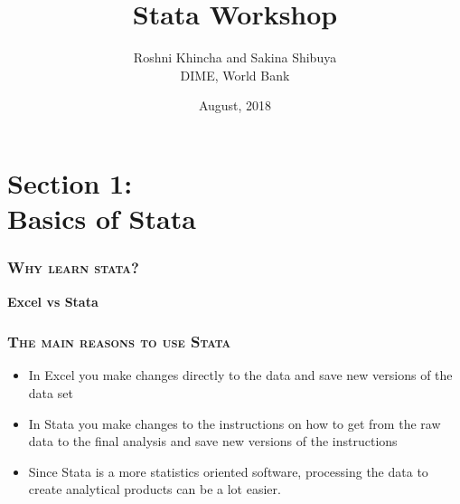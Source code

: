 \documentclass[10pt]{beamer}
\title{Stata Workshop} %
\subtitle{} %
\author{Roshni Khincha and Sakina Shibuya \\ DIME, World Bank}
\date{August, 2018}
\begin{document}
		
	\maketitle

	\section{Section 1: \\ Basics of Stata}

		\begin{frame}
		
			\frametitle{\textsc{Why learn stata?}}
			\begin{center}
				\Large \textbf{Excel vs Stata} \\ \normalsize {}
			\end{center}
		
		\end{frame}

		
		\begin{frame}
			\frametitle{\textsc{The main reasons to use Stata}}
			\begin{itemize}
				\item In Excel you make changes directly to the data and save new versions of the data set
			
				\item In Stata you make changes to the instructions on how to get from the raw data to the final analysis and save new versions of the instructions
			
				\item Since Stata is a more statistics oriented software, processing the data to create analytical products can be a lot easier. 
			
			\end{itemize}
		\end{frame}
\end{document}

